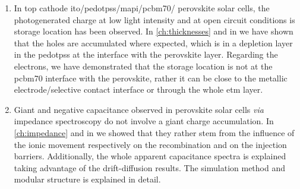 \begin{enumerate}
	\item In top cathode \gls{ito}\-/\gls{pedotpss}\-/\gls{mapi}\-/\gls{pcbm70}\-/ perovskite solar cells, the photogenerated charge at low light intensity and at open circuit conditions is storage location has been observed.
		In \cref{ch:thicknesses} and in \cite{Gelmetti2017} we have shown that the holes are accumulated where expected, which is in a depletion layer in the \gls{pedotpss} at the interface with the perovskite layer.
		Regarding the electrons, we have demonstrated that the storage location is not at the \gls{pcbm70} interface with the perovskite, rather it can be close to the metallic electrode\-/selective contact interface or through the whole \gls{etm} layer.

	\item Giant and negative capacitance observed in perovskite solar cells \textsl{via} impedance spectroscopy do not involve a giant charge accumulation.
		In \cref{ch:impedance} and in \cite{Moia2019} we showed that they rather stem from the influence of the ionic movement respectively on the recombination and on the injection barriers.
		Additionally, the whole apparent capacitance spectra is explained taking advantage of the drift\hyp{}diffusion results.
		The simulation method and modular structure is explained in detail.
\end{enumerate}